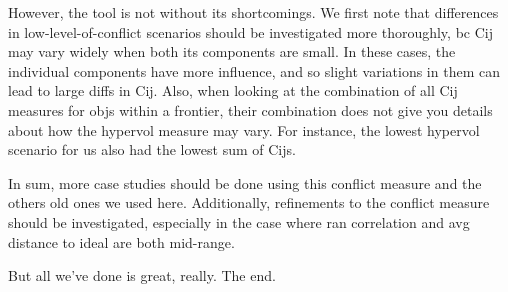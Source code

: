 However, the tool is not without its shortcomings. We first note that differences in low-level-of-conflict scenarios should be investigated more thoroughly, bc Cij may vary widely when both its components are small. In these cases, the individual components have more influence, and so slight variations in them can lead to large diffs in Cij. Also, when looking at the combination of all Cij measures for objs within a frontier, their combination does not give you details about how the hypervol measure may vary. For instance, the lowest hypervol scenario for us also had the lowest sum of Cijs.

In sum, more case studies should be done using this conflict measure and the others old ones we used here. Additionally, refinements to the conflict measure should be investigated, especially in the case where ran correlation and avg distance to ideal are both mid-range.

But all we've done is great, really. The end.